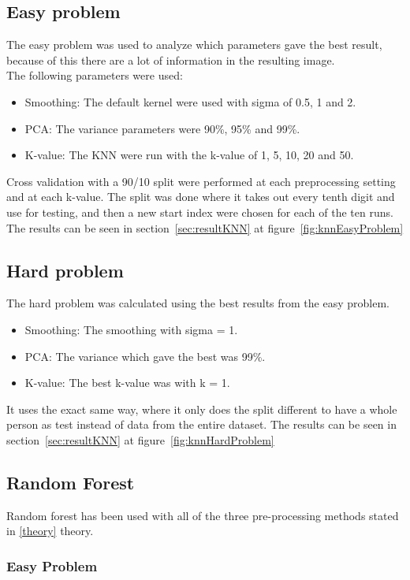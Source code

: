 \documentclass[report]{subfiles}
\begin{document}
\subsection{Easy problem}
The easy problem was used to analyze which parameters gave the best result, because of this there are a lot of information in the resulting image.\\
The following parameters were used:
\begin{itemize}
  \item Smoothing: The default kernel were used with sigma of 0.5, 1 and 2.
  \item PCA: The variance parameters were 90\%, 95\% and 99\%.
  \item K-value: The KNN were run with the k-value of 1, 5, 10, 20 and 50.
\end{itemize}
Cross validation with a 90/10 split were performed at each preprocessing setting and at each k-value. The split was done where it takes out every tenth digit and use for testing, and then a new start index were chosen for each of the ten runs.
The results can be seen in section~\ref{sec:resultKNN}  at figure~\ref{fig:knnEasyProblem}

\subsection{Hard problem}
The hard problem was calculated using the best results from the easy problem.
\begin{itemize}
  \item Smoothing: The smoothing with sigma = 1.
  \item PCA: The variance which gave the best was 99\%.
  \item K-value: The best k-value was with k = 1.
\end{itemize}
It uses the exact same way, where it only does the split different to have a whole person as test instead of data from the entire dataset.
The results can be seen in section~\ref{sec:resultKNN}  at figure~\ref{fig:knnHardProblem}

\subsection{Random Forest}
\label{sec:impRandomForest}
Random forest has been used with all of the three pre-processing methods stated in \ref{theory} \refname{theory}.

\subsubsection{Easy Problem}
\label{sec:implRF:easyProblem}
\end{document}
